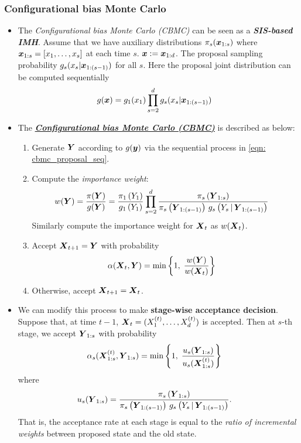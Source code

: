 \documentclass[11pt]{article}
\begin{document}
\subsubsection{Configurational bias Monte Carlo}
\begin{itemize}
\item The \emph{Configurational bias Monte Carlo (CBMC)} can be seen as a \emph{\textbf{SIS-based IMH}}. Assume that we have auxiliary distributions $\pi_s(\boldsymbol{x}_{1:s})$ where $\boldsymbol{x}_{1:s} = [x_1,\ldots, x_s]$ at each time $s$. $\boldsymbol{x}:= \boldsymbol{x}_{1:d}$. The proposal sampling probability $g_s(x_s| \boldsymbol{x}_{1:(s-1)})$ for all $s$. Here the proposal joint distribution can be computed sequentially
\begin{align}
g(\boldsymbol{x}) &= g_{1}(x_1)\prod_{s=2}^{d}g_s(x_s| \boldsymbol{x}_{1:(s-1)}) \label{eqn: cbmc_proposal_seq}
\end{align}

\item The \underline{\emph{\textbf{Configurational bias Monte Carlo (CBMC)}}} is described as below:
\begin{enumerate}
\item Generate $\boldsymbol{Y}$ according to  $g(\boldsymbol{y})$ via the sequential process in \eqref{eqn: cbmc_proposal_seq}.
\item Compute the \emph{importance weight}:
\begin{align}
w(\boldsymbol{Y}) &= \frac{\pi(\boldsymbol{Y})}{g(\boldsymbol{Y})} =\frac{\pi_1\left(Y_1\right)}{g_1\left(Y_1\right)}\prod_{s=2}^{d}\frac{\pi_s\left(\boldsymbol{Y}_{1:s}\right)}{\pi_s\left(\boldsymbol{Y}_{1:(s-1)}\right)\,g_s\left(Y_s\,|\, \boldsymbol{Y}_{1:(s-1)}\right)} \label{eqn: cbmc_importance_weight}
\end{align} Similarly compute the importance weight for $\boldsymbol{X}_{t}$ as $w(\boldsymbol{X}_t)$.
\item Accept $\boldsymbol{X}_{t+1} = \boldsymbol{Y}$ with probability 
\begin{align*}
\alpha(\boldsymbol{X}_{t}, \boldsymbol{Y}) &= \min\left\{1,\;\frac{w(\boldsymbol{Y})}{w(\boldsymbol{X}_t)}\right\}
\end{align*}
\item Otherwise, accept $\boldsymbol{X}_{t+1} = \boldsymbol{X}_{t}$.
\end{enumerate}

\item We can modify this process to make \textbf{stage-wise acceptance decision}. Suppose that, at time $t-1$, $\boldsymbol{X}_{t}= (X_1^{(t)}, \ldots, X_d^{(t)})$ is accepted. Then at $s$-th stage, we accept $\boldsymbol{Y}_{1:s}$ with probability 
\begin{align}
\alpha_{s}(\boldsymbol{X}_{1:s}^{(t)}, \boldsymbol{Y}_{1:s}) &= \min\left\{1,\;\frac{u_{s}(\boldsymbol{Y}_{1:s})}{u_{s}(\boldsymbol{X}_{1:s}^{(t)})}\right\} \label{eqn: cbmc_accept_incremental_importance_weight}
\end{align} where 
\begin{align*}
u_s(\boldsymbol{Y}_{1:s}) &= \frac{\pi_s\left(\boldsymbol{Y}_{1:s}\right)}{\pi_s\left(\boldsymbol{Y}_{1:(s-1)}\right)\,g_s\left(Y_s\,|\, \boldsymbol{Y}_{1:(s-1)}\right)}.
\end{align*} That is, the acceptance rate at each stage is equal to the \emph{ratio of incremental weights} between proposed state and the old state. 


\end{itemize}
\end{document}
